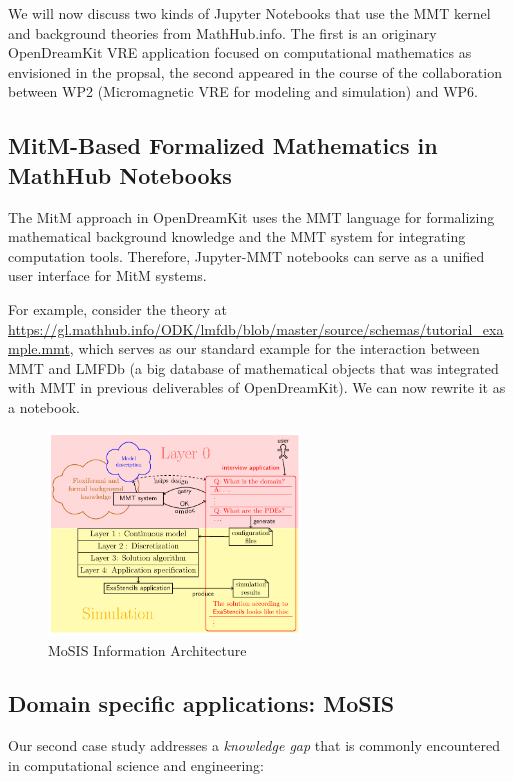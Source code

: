 We will now discuss two kinds of Jupyter Notebooks that use the MMT kernel and background theories from MathHub.info.
The first is an originary OpenDreamKit VRE application focused on computational mathematics as envisioned in the propsal, the second appeared in the course of the collaboration between WP2 (Micromagnetic VRE for modeling and simulation) and WP6. 

\subsection{MitM-Based Formalized Mathematics in MathHub Notebooks}

The MitM approach in  OpenDreamKit uses the MMT language for formalizing mathematical background knowledge and the MMT system for integrating computation tools.
Therefore, Jupyter-MMT notebooks can serve as a unified user interface for MitM systems.

For example, consider the theory at \url{https://gl.mathhub.info/ODK/lmfdb/blob/master/source/schemas/tutorial_example.mmt}, which serves as our standard example for the interaction between MMT and LMFDb (a big database of mathematical objects that was integrated with MMT in previous deliverables of OpenDreamKit).
We can now rewrite it as a notebook.

\begin{figure}[ht]\centering
  \includegraphics[width=0.6\textwidth]{proto}
  \caption{MoSIS Information Architecture}\label{fig:prototype}
\end{figure}

\subsection{Domain specific applications: MoSIS}

Our second case study addresses a \emph{knowledge gap} that is commonly encountered in computational science and engineering:


